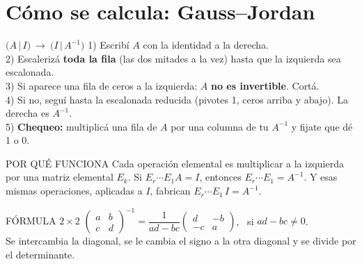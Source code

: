 \section{Cómo se calcula: Gauss--Jordan}
\begin{metodo}{$\big(A\,|\,I\big)\ \longrightarrow\ \big(I\,|\,A^{-1}\big)$}
1) Escribí $A$ con la identidad a la derecha.\\
2) Escalerizá \textbf{toda la fila} (las dos mitades a la vez) hasta que la izquierda sea escalonada.\\
3) Si aparece una fila de ceros a la izquierda: $A$ \textbf{no es invertible}. Cortá.\\
4) Si no, seguí hasta la escalonada reducida (pivotes 1, ceros arriba y abajo). La derecha es $A^{-1}$.\\
5) \textbf{Chequeo:} multiplicá una fila de $A$ por una columna de tu $A^{-1}$ y fijate que dé 1 o 0.
\end{metodo}
\begin{tip}{POR QUÉ FUNCIONA}
Cada operación elemental es multiplicar a la izquierda por una matriz elemental $E_k$. Si $E_r\cdots E_1A=I$, entonces $E_r\cdots E_1=A^{-1}$. Y esas mismas operaciones, aplicadas a $I$, fabrican $E_r\cdots E_1\,I=A^{-1}$.
\end{tip}
\begin{sello}{FÓRMULA $2\times2$}
$\begin{pmatrix}a&b\\c&d\end{pmatrix}^{-1}=\dfrac1{ad-bc}\begin{pmatrix}d&-b\\-c&a\end{pmatrix}$, \ si $ad-bc\neq0$.\\[2pt]
Se intercambia la diagonal, se le cambia el signo a la otra diagonal y se divide por el determinante.
\end{sello}

